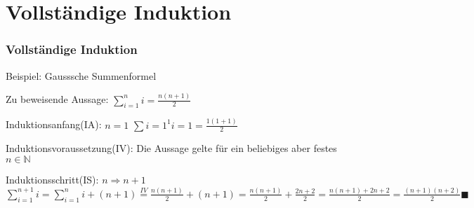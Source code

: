 \section{Vollständige Induktion}
\begin{frame}
    \frametitle{Vollständige Induktion}
    Beispiel: Gausssche Summenformel

    Zu beweisende Aussage: $\sum_{i=1}^{n} i = \frac{n(n+1)}{2}$

    Induktionsanfang(IA): $n = 1$\newline
    $\sum{i=1}^{1} i = 1 = \frac{1(1+1)}{2}$

    Induktionsvoraussetzung(IV):\newline
    Die Aussage gelte für ein beliebiges aber festes $n \in \mathbb{N}$

    Induktionsschritt(IS): $n \Rightarrow n+1$\newline
    $\sum_{i=1}^{n+1} i = \sum_{i=1}^{n} i + (n+1) \stackrel{IV}{=} \frac{n(n+1)}{2} + (n+1) = \frac{n(n+1)}{2} + \frac{2n+2}{2} = \frac{n(n+1)+2n+2}{2} = \frac{(n+1)(n+2)}{2} \blacksquare$
\end{frame}
